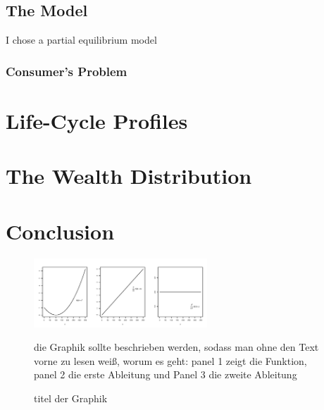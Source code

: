\documentclass[a4paper,12pt]{article}
\begin{document}
\subsection{The Model}
I chose a partial equilibrium model 

\subsubsection{Consumer's Problem}

\section{Life-Cycle Profiles}
\label{Chapter4}
\section{The Wealth Distribution}
\label{Chapter5}
\section{Conclusion}
\label{Chapter6}


\newpage





\newpage

\begin{figure}
\caption{titel der Graphik} 
\label{fig:ersteGraphik}	%
\centering
\includegraphics[width=6.5cm]{abb1.png}  %

\begin{minipage}{0.8\linewidth}
\footnotesize{die Graphik sollte beschrieben werden, sodass man ohne den Text vorne zu lesen wei\ss{}, worum es geht: panel 1 zeigt die Funktion, panel 2 die erste Ableitung und Panel 3 die zweite Ableitung}
\end{minipage}

\end{figure}
\end{document}
